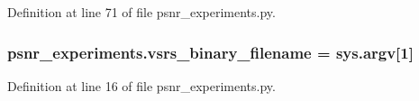 Definition at line 71 of file psnr\+\_\+experiments.\+py.

\subsubsection[{\texorpdfstring{vsrs\+\_\+binary\+\_\+filename}{vsrs_binary_filename}}]{\setlength{\rightskip}{0pt plus 5cm}psnr\+\_\+experiments.\+vsrs\+\_\+binary\+\_\+filename = sys.\+argv\mbox{[}1\mbox{]}}\hypertarget{namespacepsnr__experiments_a5deb1c458380e20e1f7ada545e800a33}{}\label{namespacepsnr__experiments_a5deb1c458380e20e1f7ada545e800a33}


Definition at line 16 of file psnr\+\_\+experiments.\+py.

